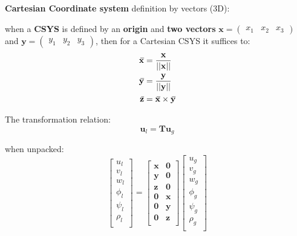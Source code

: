 \documentclass[10pt,b5paper,titlepage]{book}
\newcommand{\m}{\mathbf}
\newcommand{\closure}[2][3]{%
{}\mkern#1mu\overline{\mkern-#1mu#2}}
\newenvironment{eqarray}
{
    \begin{eqnarray}
        \begin{aligned}
}
{
        \end{aligned}
    \end{eqnarray}
}
\begin{document}


\textbf{Cartesian Coordinate system} definition by vectors (3D):

when a \textbf{CSYS} is defined by an \textbf{origin} and \textbf{two vectors}
$ \m{x} = \begin{pmatrix} x_1 & x_2 & x_3 \end{pmatrix} $
and $ \m{y} = \begin{pmatrix} y_1 & y_2 & y_3 \end{pmatrix} $,
then for a Cartesian CSYS it suffices to:
\begin{eqarray}
    \m{\closure{x}} &= \frac{\m{x}}{||\m{x}||} \\
    \m{\closure{y}} &= \frac{\m{y}}{||\m{y}||} \\
    \m{\closure{z}} &= \m{\closure{x}} \times \m{\closure{y}} \\
\end{eqarray}

The transformation relation:
\begin{equation}
    \m{u}_l = \m{T} \m{u}_g
\end{equation}

when unpacked:
\begin{equation}
    \begin{bmatrix}
        u_l \\
        v_l \\
        w_l \\
        \phi_l \\
        \psi_l \\
        \rho_l \\
    \end{bmatrix}
    = \begin{bmatrix}
        \m{x} & \m{0} \\
        \m{y} & \m{0} \\
        \m{z} & \m{0} \\
        \m{0} & \m{x} \\
        \m{0} & \m{y} \\
        \m{0} & \m{z} \\
    \end{bmatrix}
    \begin{bmatrix}
        u_g \\
        v_g \\
        w_g \\
        \phi_g \\
        \psi_g \\
        \rho_g \\
    \end{bmatrix}
\end{equation}
\end{document}
